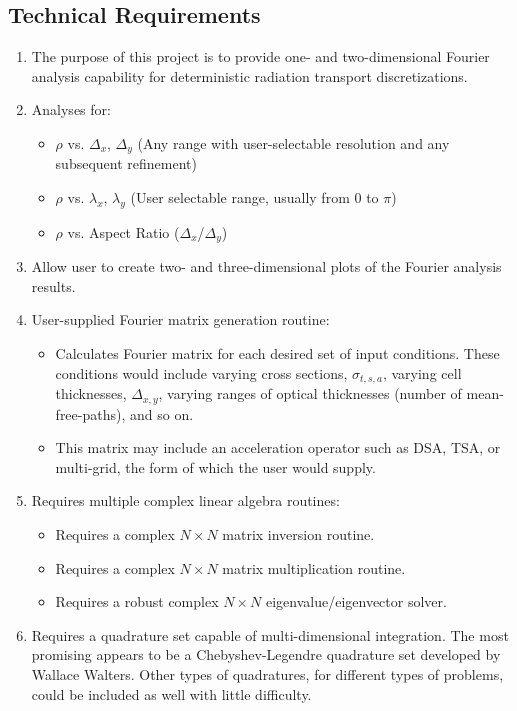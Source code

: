 \documentclass[11pt]{nmemo}
\begin{document}
\subsection{Technical Requirements}
\begin{enumerate}
 \item The purpose of this project is to provide one- and
   two-dimensional Fourier analysis
   capability for deterministic radiation transport discretizations. 
 \item Analyses for:
 \begin{itemize}
  \item $\rho$ vs. $\Delta_x$, $\Delta_y$ (Any range with
    user-selectable resolution and any subsequent refinement)
  \item $\rho$ vs. $\lambda_x$, $\lambda_y$ (User selectable range,
    usually from 0 to $\pi$)
  \item $\rho$ vs. Aspect Ratio ($\Delta_x$/$\Delta_y$)
 \end{itemize}
 \item Allow user to create two- and three-dimensional plots of the
   Fourier analysis results.
 \item User-supplied Fourier matrix generation routine: 
 \begin{itemize}
  \item Calculates Fourier matrix for each desired set of input
    conditions.  These conditions would include varying cross sections, 
    $\sigma_{t,s,a}$, varying cell thicknesses,
    $\Delta_{x,y}$, varying ranges of optical thicknesses
    (number of mean-free-paths), and so on.
  \item This matrix may include an acceleration operator such as DSA, TSA, or
    multi-grid, the form of which the user would supply. 
 \end{itemize}
 \item Requires multiple complex linear algebra routines:
 \begin{itemize}
  \item Requires a complex ${N \times N}$ matrix inversion routine.
  \item Requires a complex ${N \times N}$ matrix multiplication routine.
  \item Requires a robust complex ${N \times N}$ eigenvalue/eigenvector solver.
 \end{itemize}
 \item Requires a quadrature set capable of multi-dimensional
   integration.  The most promising appears to be a
   Chebyshev-Legendre quadrature set developed by Wallace Walters.
   Other types of quadratures, for different types of problems, could
   be included as well with little difficulty. 
\end{enumerate}
\end{document}
